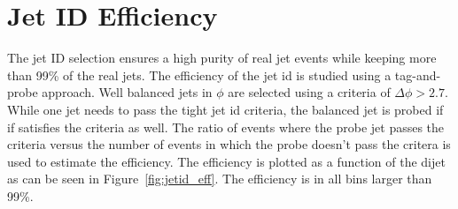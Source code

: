 \section{Jet ID Efficiency}

The jet ID selection ensures a high purity of real jet events while keeping more than 99\% of the real jets.
The efficiency of the jet id is studied using a tag-and-probe approach. Well balanced jets in $\phi$ are selected
using a criteria of $\Delta \phi > 2.7$. While one jet needs to pass the tight jet id criteria, the balanced jet is probed
if if satisfies the criteria as well. The ratio of events where the probe jet passes the criteria versus the number of events
in which the probe doesn't pass the critera is used to estimate the efficiency. The efficiency is plotted as a function of the
dijet \ptavg as can be seen in Figure~\ref{fig:jetid_eff}. The efficiency is in all bins larger than 99\%.

